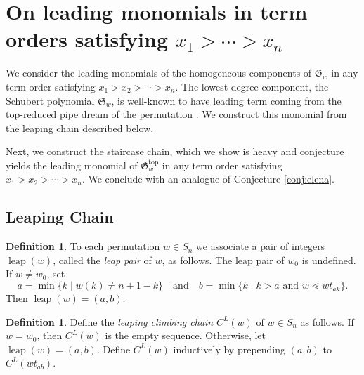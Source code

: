 \documentclass[11pt]{amsart}
\theoremstyle{definition}
\newtheorem{definition}[theorem]{Definition}
\theoremstyle{named}
\newcommand{\CL}{C^L}
\DeclareMathOperator{\leap}{\mathrm{leap}}
\begin{document}
	\section{On leading monomials in term orders satisfying $x_1>\cdots>x_n$}
	\label{sec:>}
	We consider the leading monomials of the homogeneous components of $\mathfrak{G}_w$ in any term order satisfying $x_1>x_2>\cdots>x_n$. The lowest degree component, the Schubert polynomial $\mathfrak{S}_w$, is well-known to have leading term coming from the top-reduced pipe dream of the permutation \cite{laddermoves}. We construct this monomial from the leaping chain described below.
	
	Next, we construct the staircase chain, which we show is heavy and conjecture yields the leading monomial of $\mathfrak{G}_w^{\mathrm{top}}$ in any term order satisfying $x_1>x_2>\cdots>x_n$. We conclude with an analogue of Conjecture \ref{conj:elena}.

	\subsection{Leaping Chain}
	\label{sec:leap}
	\begin{definition}
		To each permutation $w\in S_n$ we associate a pair of integers $\leap(w)$, called the \emph{leap pair} of $w$, as follows. The leap pair of $w_0$ is undefined. If $w\neq w_0$, set 
		\[a=\min\{k\mid w(k)\neq n+1-k\}\quad \mbox{and}\quad b=\min\{k\mid k>a\mbox{ and }w\lessdot wt_{ak}\}.\] 
		Then $\leap(w)=(a,b)$.
	\end{definition}
	
	\begin{definition}
		Define the \emph{leaping climbing chain} $\CL(w)$ of $w\in S_n$ as follows. If $w=w_0$, then $\CL(w)$ is the empty sequence. Otherwise, let $\leap(w)=(a,b)$. Define $\CL(w)$ inductively by prepending $(a,b)$ to $\CL(wt_{ab})$.
	\end{definition}
	
\end{document}
